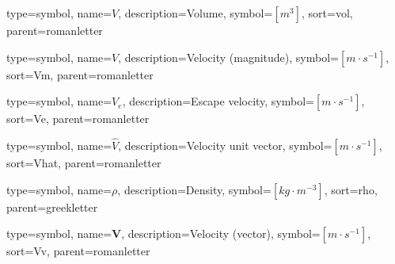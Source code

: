 {
	type=symbol, %
	name={\ensuremath{\mathit{V}}}, %
	description={Volume}, %
	symbol={$\left[m^{3}\right]$}, %
	sort=vol, %
	parent=romanletter %
}

{
type=symbol, %
name={\ensuremath{V}}, %
description={Velocity (magnitude)}, %
symbol={$\left[m\cdot s^{-1}\right]$}, %
sort=Vm, %
parent=romanletter %
}

{
type=symbol, %
name={\ensuremath{V_e}}, %
description={Escape velocity}, %
symbol={$\left[m\cdot s^{-1}\right]$}, %
sort=Ve, %
parent=romanletter %
}

{
	type=symbol, %
	name={\ensuremath{\hat{V}}}, %
	description={Velocity unit vector}, %
	symbol={$\left[m\cdot s^{-1}\right]$}, %
	sort=Vhat, %
	parent=romanletter %
}

{
type=symbol, %
name={\ensuremath{\rho}}, %
description={Density}, %
symbol={$\left[kg\cdot m^{-3}\right]$}, %
sort=rho, %
parent=greekletter %
}

{
type=symbol, %
name={\ensuremath{\mathbf{V}}}, %
description={Velocity (vector)}, %
symbol={$\left[m\cdot s^{-1}\right]$}, %
sort=Vv, %
parent=romanletter %
}

